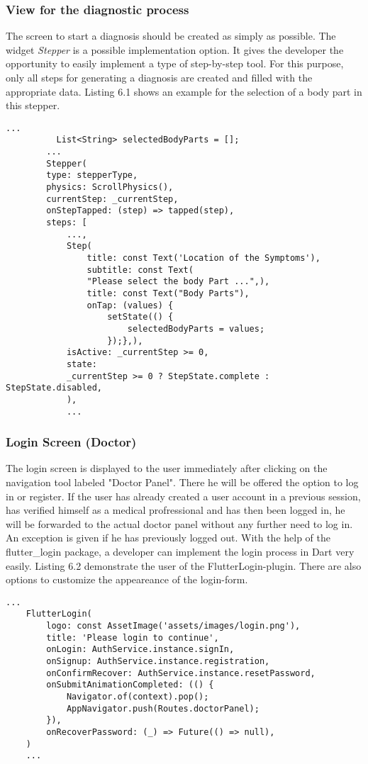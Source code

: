 \subsubsection{\textbf{View for the diagnostic process}}
The screen to start a diagnosis should be created as simply as possible. The widget \textit{Stepper} is a possible implementation option. It gives the developer the opportunity to easily implement a type of step-by-step tool. For this purpose, only all steps for generating a diagnosis are created and filled with the appropriate data. Listing 6.1 shows an example for the selection of a body part in this stepper.
	\scriptsize
	\begin{lstlisting}[caption=Stepper for Body Part Selection]
		...
		  List<String> selectedBodyParts = [];
		...
		Stepper(
		type: stepperType,
		physics: ScrollPhysics(),
		currentStep: _currentStep,
		onStepTapped: (step) => tapped(step),
		steps: [
			...,
			Step(
				title: const Text('Location of the Symptoms'),
				subtitle: const Text(
				"Please select the body Part ...",),
				title: const Text("Body Parts"),
				onTap: (values) {
					setState(() {
						selectedBodyParts = values;
					});},),
			isActive: _currentStep >= 0,
			state:
			_currentStep >= 0 ? StepState.complete : StepState.disabled,
			),
			...
	\end{lstlisting}
	\normalsize
\subsubsection{\textbf{Login Screen (Doctor)}}
The login screen is displayed to the user immediately after clicking on the navigation tool labeled "Doctor Panel". There he will be offered the option to log in or register. If the user has already created a user account in a previous session, has verified himself as a medical profressional and has then been logged in, he will be forwarded to the actual doctor panel without any further need to log in. An exception is given if he has previously logged out. With the help of the flutter\_login package, a developer can implement the login process in Dart very easily. Listing 6.2 demonstrate the user of the FlutterLogin-plugin. There are also options to customize the appeareance of the login-form.
	\scriptsize
\begin{lstlisting}[caption=Stepper for Body Part Selection]
	...
	FlutterLogin(
		logo: const AssetImage('assets/images/login.png'),
		title: 'Please login to continue',
		onLogin: AuthService.instance.signIn,
		onSignup: AuthService.instance.registration,
		onConfirmRecover: AuthService.instance.resetPassword,
		onSubmitAnimationCompleted: (() {
			Navigator.of(context).pop();
			AppNavigator.push(Routes.doctorPanel);
		}),
		onRecoverPassword: (_) => Future(() => null),
	)
	...
\end{lstlisting}
\normalsize
